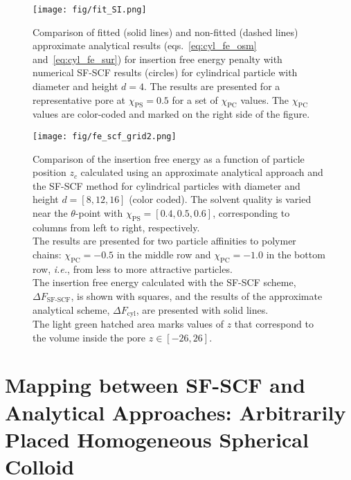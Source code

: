 \documentclass[10pt, a4paper]{article}
\begin{document}
\begin{multicols}{2}
\begin{figure}[H]
    \centering
    \texttt{[image: fig/fit\_SI.png]}
    \caption{
    Comparison of fitted (solid lines) and non-fitted (dashed lines) approximate analytical results (eqs.~\ref{eq:cyl_fe_osm} and~\ref{eq:cyl_fe_sur}) for insertion free energy penalty with numerical SF-SCF results (circles) for cylindrical particle with diameter and height $d = 4$.
    The results are presented for a representative pore at $\chi_{\text{PS}} = 0.5$ for a set of $\chi_{\text{PC}}$ values.
    The $\chi_{\text{PC}}$ values are color-coded and marked on the right side of the figure.
    }
    \label{fig:fit_SI}
\end{figure}

\begin{figure}[H]
    \centering
    \texttt{[image: fig/fe\_scf\_grid2.png]}
    \caption{ 
    Comparison of the insertion free energy as a function of particle position $z_c$ calculated using an approximate analytical approach and the SF-SCF method for cylindrical particles with diameter and height $d = [8, 12, 16]$ (color coded).
    The solvent quality is varied near the $\theta$-point with $\chi_{\text{PS}} = [0.4, 0.5, 0.6]$, corresponding to columns from left to right, respectively.\\
    The results are presented for two particle affinities to polymer chains: $\chi_{\text{PC}} = -0.5$ in the middle row and $\chi_{\text{PC}} = -1.0$ in the bottom row, \emph{i.e.}, from less to more attractive particles.\\
    The insertion free energy calculated with the SF-SCF scheme, $\Delta F_{\text{SF-SCF}}$, is shown with squares, and the results of the approximate analytical scheme, $\Delta F_{\text{cyl}}$, are presented with solid lines.\\
    The light green hatched area marks values of $z$ that correspond to the volume inside the pore $z \in [-26, 26]$.
    \label{fig:fe_scf_grid}
    }
\end{figure}

\end{multicols}


\section{Mapping between SF-SCF and Analytical Approaches: Arbitrarily Placed Homogeneous Spherical Colloid}
\end{document}
